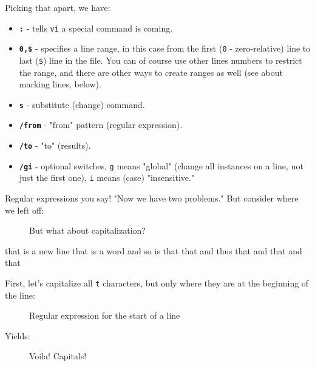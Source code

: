 \documentclass[10pt,american,]{book}
\newenvironment{Shaded}{\begin{snugshade}}{\end{snugshade}}
\newcommand{\KeywordTok}[1]{\textcolor[rgb]{0.13,0.29,0.53}{\textbf{{#1}}}}
\newcommand{\OtherTok}[1]{\textcolor[rgb]{0.56,0.35,0.01}{{#1}}}
\newcommand{\NormalTok}[1]{{#1}}
\numberwithin{figure}{chapter}
\DeclareRobustCommand{\drcap}[1]{\begin{figure}[H]\caption{#1}\end{figure}}
\renewcommand{\KeywordTok}[1]{{#1}}
\renewcommand{\OtherTok}[1]{{#1}}
\renewcommand{\NormalTok}[1]{{#1}}
\begin{document}
Picking that apart, we have:

\begin{itemize}
\item
  \textbf{\texttt{:}} - tells \texttt{vi} a special command is coming.
\item
  \textbf{\texttt{0,\$}} - specifies a line range, in this case from the
  first (\texttt{0} - zero-relative) line to last (\texttt{\$}) line in
  the file. You can of course use other lines numbers to restrict the
  range, and there are other ways to create ranges as well (see about
  marking lines, below).
\item
  \textbf{\texttt{s}} - substitute (change) command.
\item
  \textbf{\texttt{/from}} - "from" pattern (regular expression).
\item
  \textbf{\texttt{/to}} - "to" (results).
\item
  \textbf{\texttt{/gi}} - optional switches, \texttt{g} means "global"
  (change all instances on a line, not just the first one), \texttt{i}
  means (case) "insensitive."
\end{itemize}

Regular expressions you say! "Now we have two
problems." But consider where we left off:

\drcap{But what about capitalization?}

\begin{Shaded}
\begin{Highlighting}[]
\KeywordTok{that} \NormalTok{is a new line}
\KeywordTok{that} \NormalTok{is a word}
\KeywordTok{and} \NormalTok{so is that}
\KeywordTok{that} \NormalTok{and thus}
\KeywordTok{that} \NormalTok{and that and that}
\end{Highlighting}
\end{Shaded}

First, let's capitalize all \texttt{t} characters, but only where they
are at the beginning of the line:

\drcap{Regular expression for the start of a line}

\begin{Shaded}
\end{Shaded}

Yields:

\drcap{Voila! Capitals!}
\end{document}
